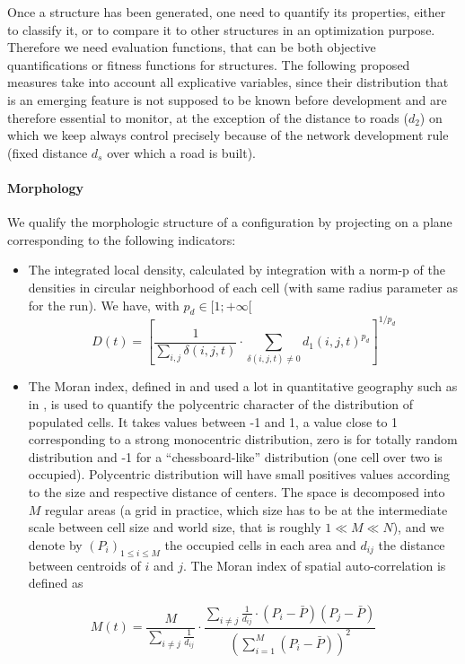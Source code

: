 \documentclass[a4paper,twocolumn,twoside,10pt]{article}
\begin{document}
Once a structure has been generated, one need to quantify its properties,
either to classify it, or to compare it to other structures in an
optimization purpose. Therefore we need evaluation functions, that
can be both objective quantifications or fitness functions for structures.
The following proposed measures take into account all explicative
variables, since their distribution that is an emerging feature is
not supposed to be known before development and are therefore essential
to monitor, at the exception of the distance to roads ($d_{2}$) on
which we keep always control precisely because of the network development
rule (fixed distance $d_{s}$ over which a road is built).


\paragraph{Morphology}

We qualify the morphologic structure of a configuration by projecting
on a plane corresponding to the following indicators:
\begin{itemize}
\item The integrated local density, calculated by integration with a norm-p
of the densities in circular neighborhood of each cell (with same
radius parameter as for the run). We have, with $p_{d}\in[1;+\infty[$
\[
D(t)=\left[\frac{1}{\sum_{i,j}\delta(i,j,t)}\cdot\sum_{\delta(i,j,t)\neq0}d_{1}(i,j,t)^{p_{d}}\right]^{1/p_{d}}
\]

\item The Moran index, defined in \cite{tsai2005quantifying} and used a
lot in quantitative geography such as in \cite{lenechet:hal-00696445},
is used to quantify the polycentric character of the distribution
of populated cells. It takes values between -1 and 1, a value close
to 1 corresponding to a strong monocentric distribution, zero is for
totally random distribution and -1 for a ``chessboard-like'' distribution
(one cell over two is occupied). Polycentric distribution will have
small positives values according to the size and respective distance
of centers. The space is decomposed into $M$ regular areas (a grid
in practice, which size has to be at the intermediate scale between
cell size and world size, that is roughly $1\ll M\ll N$), and we
denote by $(P_{i})_{1\leq i\leq M}$ the occupied cells in each area
and $d_{ij}$ the distance between centroids of $i$ and $j$. The
Moran index of spatial auto-correlation is defined as
\end{itemize}
\[
M(t)=\frac{M}{\sum_{i\neq j}\frac{1}{d_{ij}}}\cdot\frac{\sum_{i\neq j}\frac{1}{d_{ij}}\cdot(P_{i}-\bar{P})(P_{j}-\bar{P})}{(\sum_{i=1}^{M}(P_{i}-\bar{P}))^{2}}
\]
\end{document}
